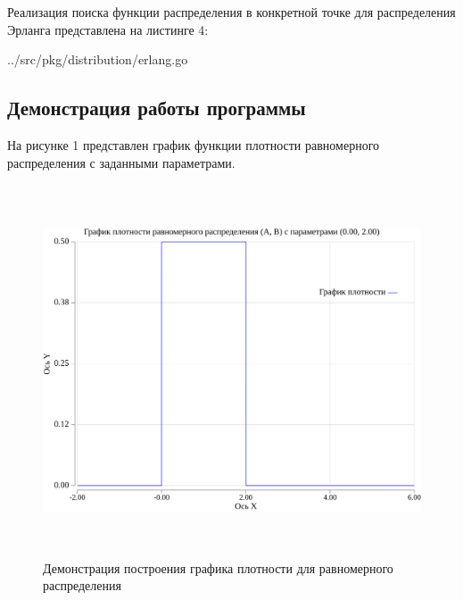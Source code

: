 Реализация поиска функции распределения в конкретной точке для распределения Эрланга представлена на листинге 4:
\FloatBarrier
\begin{lstinputlisting}[language=go, caption=Расчёт функции распределения случайной величины для распределения Эрланга, linerange={40-48}, 
	basicstyle=\footnotesize\ttfamily, frame=single, breaklines=true]{../src/pkg/distribution/erlang.go}
	\label{er1}
\end{lstinputlisting}
\FloatBarrier

\subsection*{Демонстрация работы программы}
На рисунке 1 представлен график функции плотности равномерного распределения с заданными параметрами.

\FloatBarrier
\begin{figure}[h]
	\begin{center}
		\includegraphics[width=\linewidth, height=11cm]{inc/verProb.png}
	\end{center}
	\caption{Демонстрация построения графика плотности для равномерного распределения}
\end{figure}
\FloatBarrier

